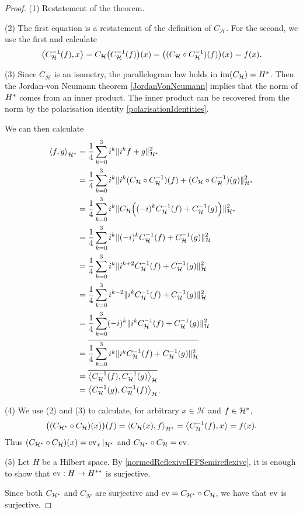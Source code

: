 \begin{proof}
(1) Restatement of the theorem.

(2) The first equation is a restatement of the definition of $C_\mathcal{H}$. For the second, we use the first and calculate
\[ \left\langle C_\mathcal{H}^{-1}(f), x \right\rangle = C_\mathcal{H}\big(C_\mathcal{H}^{-1}(f)\big)(x) = \big((C_\mathcal{H}\circ C_\mathcal{H}^{-1})(f)\big)(x) = f(x). \]

(3) Since $C_\mathcal{H}$ is an isometry, the parallelogram law holds in $\operatorname{im}(C_{\mathcal{H}}) = {H}^*$. Then the Jordan-von Neumann theorem \ref{JordanVonNeumann} implies that the norm of ${H}^*$ comes from an inner product. The inner product can be recovered from the norm by the polarisation identity \ref{polarisationIdentities}.

We can then calculate
\begin{align*}
\left\langle f,g \right\rangle_{{\mathcal{H}}^*} &= \frac{1}{4}\sum_{k=0}^3 i^k\lVert i^kf+ g\rVert^2_{{\mathcal{H}}^*} \\
&= \frac{1}{4}\sum_{k=0}^3 i^k\lVert i^k(C_\mathcal{H}\circ C_\mathcal{H}^{-1})(f)+ (C_\mathcal{H}\circ C_\mathcal{H}^{-1})(g)\rVert^2_{{\mathcal{H}}^*} \\
&= \frac{1}{4}\sum_{k=0}^3 i^k\lVert C_\mathcal{H}\Big((-i)^kC_\mathcal{H}^{-1}(f)+ C_\mathcal{H}^{-1}(g)\Big)\rVert^2_{{\mathcal{H}}^*} \\
&= \frac{1}{4}\sum_{k=0}^3 i^k\lVert(-i)^kC_\mathcal{H}^{-1}(f)+ C_\mathcal{H}^{-1}(g)\rVert^2_{\mathcal{H}} \\
&= \frac{1}{4}\sum_{k=0}^3 i^k\lVert i^{k+2}C_\mathcal{H}^{-1}(f)+ C_\mathcal{H}^{-1}(g)\rVert^2_{\mathcal{H}} \\
&= \frac{1}{4}\sum_{k=0}^3 i^{k-2}\lVert i^{k}C_\mathcal{H}^{-1}(f)+ C_\mathcal{H}^{-1}(g)\rVert^2_{\mathcal{H}} \\
&= \frac{1}{4}\sum_{k=0}^3 (-i)^{k}\lVert i^{k}C_\mathcal{H}^{-1}(f)+ C_\mathcal{H}^{-1}(g)\rVert^2_{\mathcal{H}} \\
&= \overline{\frac{1}{4}\sum_{k=0}^3 i^{k}\lVert i^{k}C_\mathcal{H}^{-1}(f)+ C_\mathcal{H}^{-1}(g)\rVert^2_{\mathcal{H}}} \\
&= \overline{\left\langle C_\mathcal{H}^{-1}(f), C_\mathcal{H}^{-1}(g) \right\rangle_{\mathcal{H}}} \\
&= \left\langle C_\mathcal{H}^{-1}(g), C_\mathcal{H}^{-1}(f) \right\rangle_{\mathcal{H}}.
\end{align*}

(4) We use (2) and (3) to calculate, for arbitrary $x\in \mathcal{H}$ and $f\in{\mathcal{H}}^*$,
\[ \big((C_{{\mathcal{H}}^*}\circ C_\mathcal{H})(x)\big)(f) = \left\langle C_\mathcal{H}(x), f \right\rangle_{{\mathcal{H}}^*} = \left\langle C^{-1}_{\mathcal{H}}(f), x \right\rangle = f(x). \]
Thus $(C_{{\mathcal{H}}^*}\circ C_\mathcal{H})(x) = \operatorname{ev}_x|_{{\mathcal{H}}^*}$ and $C_{{\mathcal{H}}^*}\circ C_\mathcal{H} = \operatorname{ev}$.

(5) Let $H$ be a Hilbert space. By \ref{normedReflexiveIFFSemireflexive}, it is enough to show that $\operatorname{ev}: H\to {H}^{**}$ is surjective.

Since both $C_{{\mathcal{H}}^*}$ and $C_\mathcal{H}$ are surjective and $\operatorname{ev} = C_{{\mathcal{H}}^*}\circ C_\mathcal{H}$, we have that $\operatorname{ev}$ is surjective.
\end{proof}
